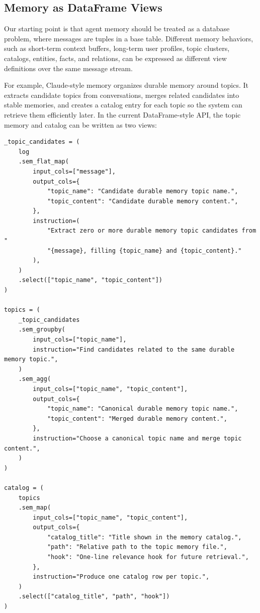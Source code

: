 \documentclass[11pt]{article}
\begin{document}
\subsection{Memory as DataFrame Views}

Our starting point is that agent memory should be treated as a database
problem, where messages are tuples in a base table. Different memory behaviors,
such as short-term context buffers, long-term user profiles, topic clusters,
catalogs, entities, facts, and relations, can be expressed as different view
definitions over the same message stream.

For example, Claude-style memory organizes durable memory around topics. It
extracts candidate topics from conversations, merges related candidates into
stable memories, and creates a catalog entry for each topic so the system can
retrieve them efficiently later. In the current DataFrame-style API, the topic
memory and catalog can be written as two views:

\begin{verbatim}
_topic_candidates = (
    log
    .sem_flat_map(
        input_cols=["message"],
        output_cols={
            "topic_name": "Candidate durable memory topic name.",
            "topic_content": "Candidate durable memory content.",
        },
        instruction=(
            "Extract zero or more durable memory topic candidates from "
            "{message}, filling {topic_name} and {topic_content}."
        ),
    )
    .select(["topic_name", "topic_content"])
)

topics = (
    _topic_candidates
    .sem_groupby(
        input_cols=["topic_name"],
        instruction="Find candidates related to the same durable memory topic.",
    )
    .sem_agg(
        input_cols=["topic_name", "topic_content"],
        output_cols={
            "topic_name": "Canonical durable memory topic name.",
            "topic_content": "Merged durable memory content.",
        },
        instruction="Choose a canonical topic name and merge topic content.",
    )
)

catalog = (
    topics
    .sem_map(
        input_cols=["topic_name", "topic_content"],
        output_cols={
            "catalog_title": "Title shown in the memory catalog.",
            "path": "Relative path to the topic memory file.",
            "hook": "One-line relevance hook for future retrieval.",
        },
        instruction="Produce one catalog row per topic.",
    )
    .select(["catalog_title", "path", "hook"])
)
\end{verbatim}
\end{document}
